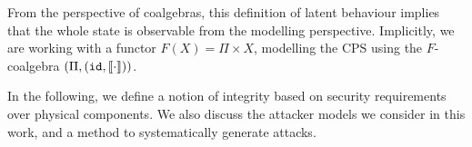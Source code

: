 {\color{red} From the perspective of coalgebras, this definition of latent behaviour implies that the whole state is observable from the modelling perspective. Implicitly, we are working with a functor $F(X)=\Pi\times X$, modelling the CPS using the $F$-coalgebra $(\Pi,({\texttt{id}},{{{\llbracket\cdot\rrbracket}}}))$. 
}

In the following, we define a notion of integrity based on security requirements over physical components. We also discuss the attacker models we consider in this work, and a method to systematically generate attacks.

